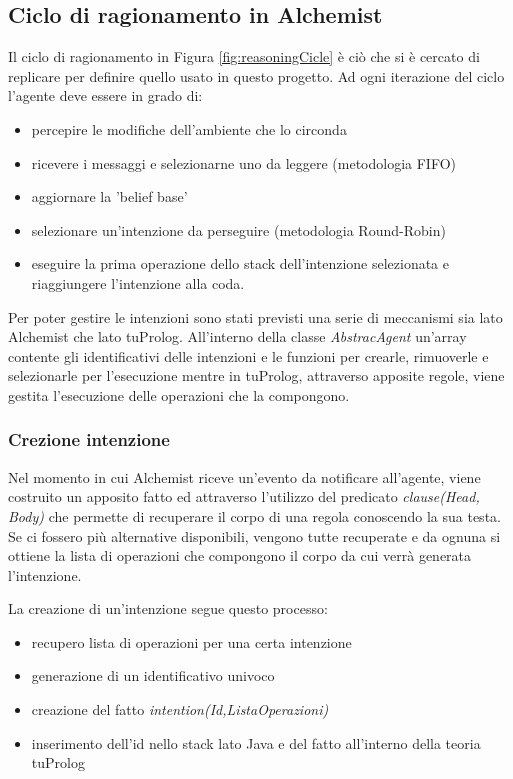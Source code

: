 \documentclass[12pt,a4paper,openright,twoside]{report}
\begin{document}
\subsection{Ciclo di ragionamento in Alchemist}
Il ciclo di ragionamento in Figura \ref{fig:reasoningCicle} \`e ci\`o che si \`e cercato di replicare per definire quello usato in questo progetto.
Ad ogni iterazione del ciclo l'agente deve essere in grado di:
\begin{itemize}
   \item percepire le modifiche dell'ambiente che lo circonda
   \item ricevere i messaggi e selezionarne uno da leggere (metodologia FIFO)
   \item aggiornare la 'belief base'
   \item selezionare un'intenzione da perseguire (metodologia Round-Robin)
   \item eseguire la prima operazione dello stack dell'intenzione selezionata e riaggiungere l'intenzione alla coda.
\end{itemize}

Per poter gestire le intenzioni sono stati previsti una serie di meccanismi sia lato Alchemist che lato tuProlog. All'interno della classe \textit{AbstracAgent} un'array contente gli identificativi delle intenzioni e le funzioni per crearle, rimuoverle e selezionarle per l'esecuzione mentre in tuProlog, attraverso apposite regole, viene gestita l'esecuzione delle operazioni che la compongono.

\subsubsection{Crezione intenzione}
Nel momento in cui Alchemist riceve un'evento da notificare all'agente, viene costruito un apposito fatto ed attraverso l'utilizzo del predicato \textit{clause(Head, Body)} che permette di recuperare il corpo di una regola conoscendo la sua testa. Se ci fossero pi\`u alternative disponibili, vengono tutte recuperate e da ognuna si ottiene la lista di operazioni che compongono il corpo da cui verr\`a generata l'intenzione.

\medskip

La creazione di un'intenzione segue questo processo:
\begin{itemize}
   \item recupero lista di operazioni per una certa intenzione
   \item generazione di un identificativo univoco
   \item creazione del fatto \textit{intention(Id,ListaOperazioni)}
   \item inserimento dell'id nello stack lato Java e del fatto all'interno della teoria tuProlog
\end{itemize}
\end{document}
